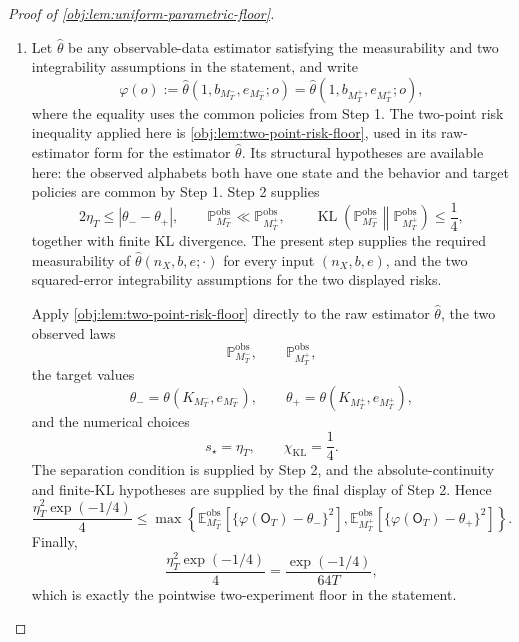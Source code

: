 \begin{proof}[Proof of \cref{obj:lem:uniform-parametric-floor}]
\begin{enumerate}
action coordinates.  The observed laws in the statement are the pushforwards
\[
\mathbb P_{M_T^-}^{\mathrm{obs}}
=(\mathfrak d_T)_\#\Pi_{-,T}^{\mathrm{code}},
\qquad
\mathbb P_{M_T^+}^{\mathrm{obs}}
=(\mathfrak d_T)_\#\Pi_{+,T}^{\mathrm{code}}.
\]
KL divergence is monotone under measurable pushforward, so the preceding coded
product bound gives
\[
\operatorname{KL}\!\left(
\mathbb P_{M_T^-}^{\mathrm{obs}}
\middle\|
\mathbb P_{M_T^+}^{\mathrm{obs}}
\right)
\le
\operatorname{KL}(\Pi_{-,T}^{\mathrm{code}}\|
\Pi_{+,T}^{\mathrm{code}})
\le
\frac14.
\]
This is the observed KL budget in \cref{obj:lem:parametric-pair-observed-kl}.
The positive one-epoch masses give
\(\Pi_{-,T}^{\mathrm{code}}\ll\Pi_{+,T}^{\mathrm{code}}\), hence also
\(\mathbb P_{M_T^-}^{\mathrm{obs}}\ll\mathbb P_{M_T^+}^{\mathrm{obs}}\), and the
displayed upper bound gives finite KL divergence. %

\item Let \(\widehat\theta\) be any observable-data estimator satisfying the
measurability and two integrability assumptions in the statement, and write
\[
\varphi(o):=
\widehat\theta(1,b_{M_T^-},e_{M_T^-};o)
=
\widehat\theta(1,b_{M_T^+},e_{M_T^+};o),
\]
where the equality uses the common policies from Step 1.  The two-point risk
inequality applied here is \cref{obj:lem:two-point-risk-floor}, used in its
raw-estimator form for the estimator \(\widehat\theta\).  Its structural
hypotheses are available here: the observed alphabets both have one state and
the behavior and target policies are common by Step 1.  Step 2 supplies
\[
2\eta_T\le |\theta_- - \theta_+|,
\qquad
\mathbb P_{M_T^-}^{\mathrm{obs}}\ll
\mathbb P_{M_T^+}^{\mathrm{obs}},
\qquad
\operatorname{KL}\!\left(
\mathbb P_{M_T^-}^{\mathrm{obs}}
\middle\|
\mathbb P_{M_T^+}^{\mathrm{obs}}
\right)
\le \frac14,
\]
together with finite KL divergence.  The present step supplies the required
measurability of \(\widehat\theta(n_X,b,e;\cdot)\) for every input
\((n_X,b,e)\), and the two squared-error integrability assumptions for the two
displayed risks.

Apply \cref{obj:lem:two-point-risk-floor} directly to the raw estimator
\(\widehat\theta\), the two observed laws
\[
\mathbb P_{M_T^-}^{\mathrm{obs}},
\qquad
\mathbb P_{M_T^+}^{\mathrm{obs}},
\]
the target values
\[
\theta_-=
\theta(K_{M_T^-},e_{M_T^-}),
\qquad
\theta_+=
\theta(K_{M_T^+},e_{M_T^+}),
\]
and the numerical choices
\[
s_\star=\eta_T,
\qquad
\chi_{\mathrm{KL}}=\frac14.
\]
The separation condition is supplied by Step 2, and the absolute-continuity and
finite-KL hypotheses are supplied by the final display of Step 2.  Hence
\[
\frac{\eta_T^2\exp(-1/4)}{4}
\le
\max\left\{
\mathbb E_{M_T^-}^{\mathrm{obs}}
\!\left[
\{\varphi(\mathsf O_T)-\theta_-\}^2
\right],
\mathbb E_{M_T^+}^{\mathrm{obs}}
\!\left[
\{\varphi(\mathsf O_T)-\theta_+\}^2
\right]
\right\}.
\]
Finally,
\[
\frac{\eta_T^2\exp(-1/4)}{4}
=
\frac{\exp(-1/4)}{64T},
\]
which is exactly the pointwise two-experiment floor in the statement.


\end{enumerate}
\end{proof}
